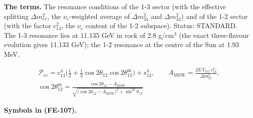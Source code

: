 \documentclass[
  10pt,
]{article}
\begin{document}
\textbf{The terms.} The resonance conditions of the 1-3 sector (with the
effective splitting \(\Delta m_{ee}^2\), the \(\nu_e\)-weighted average
of \(\Delta m_{31}^2\) and \(\Delta m_{32}^2\)) and of the 1-2 sector
(with the factor \(c_{13}^2\), the \(\nu_e\) content of the 1-2
subspace). Status: STANDARD. The 1-3 resonance lies at 11.135 GeV in
rock of 2.8 g/cm\(^3\) (the exact three-flavour evolution gives 11.133
GeV); the 1-2 resonance at the centre of the Sun at 1.93 MeV.

\[
\begin{aligned}
&\mathcal{P}_{ee} = c_{13}^4\Big(\frac12 + \frac12\cos2\theta_{12}\cos2\theta^{\mathrm{m}}_{12}\Big) +
 s_{13}^4,\qquad
 A_{\mathrm{MSW}} = \frac{2E\,V_{\mathrm{CC}}\,c_{13}^2}{\Delta m_{21}^2},\\
&\cos2\theta^{\mathrm{m}}_{12} = \frac{\cos2\theta_{12} - A_{\mathrm{MSW}}}{\sqrt{\big(\cos2\theta_{12}
 - A_{\mathrm{MSW}}\big)^2
 + \sin^22\theta_{12}}}
\end{aligned} \tag{FE-107}
\]

\textbf{Symbols in (FE-107).}
\end{document}
